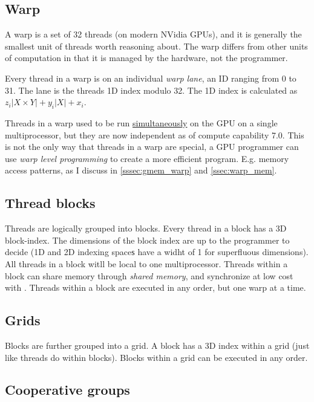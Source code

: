 \documentclass[a4paper,titlepage,12pt]{article}
\begin{document}
\begin{description}[left = \parindent]
\subsection{Warp}

A warp is a set of 32 threads (on modern NVidia GPUs), and it is generally the smallest unit of threads worth reasoning about.
The warp differs from other units of computation in that it is managed by the hardware, not the programmer.

Every thread in a warp is on an individual {\em warp lane}, an ID ranging from 0 to 31.
The lane is the threads 1D index modulo 32.
The 1D index is calculated as \(z_i|X\times Y|+ y_i|X| + x_i\).

Threads in a warp used to be run \underline{simultaneously} on the GPU on a single multiprocessor, but they are now independent as of compute capability 7.0. %
This is not the only way that threads in a warp are special, a GPU programmer can use {\em warp level programming} to create a more efficient program.
E.g. memory access patterns, as I discuss in \ref{sssec:gmem_warp} and \ref{ssec:warp_mem}.



\subsection{Thread blocks}

Threads are logically grouped into blocks.
Every thread in a block has a 3D block-index.
The dimensions of the block index are up to the programmer to decide (1D and 2D indexing spaceѕ have a widht of 1 for superfluous dimensions).
All threads in a block witll be local to one multiprocessor.
Threads within a block can share memory through {\em shared memory}, and synchronize at low cost with .
Threads within a block are executed in any order, but one warp at a time.

\subsection{Grids}

Blocks are further grouped into a grid.
A block has a 3D index within a grid (just like threads do within blocks).
Blocks within a grid can be executed in any order.

\subsection{Cooperative groups}


\end{description}
\end{document}
